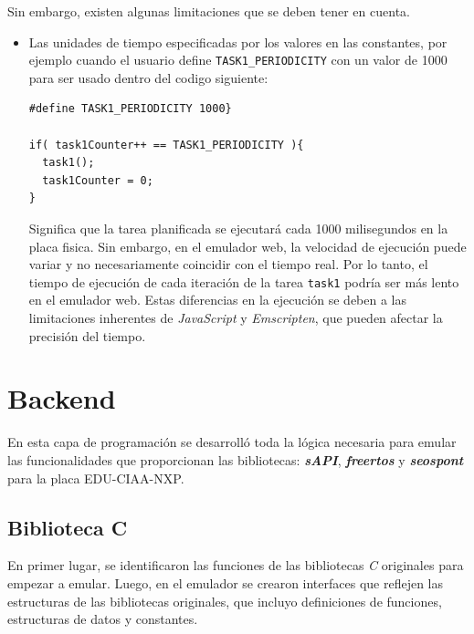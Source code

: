 Sin embargo, existen algunas limitaciones que se deben tener en cuenta.

\begin{itemize}
	\item Las unidades de tiempo especificadas por los valores en las constantes, por ejemplo cuando el usuario define \texttt{TASK1\_PERIODICITY} con un valor de 1000 para ser usado dentro del codigo siguiente: 
	
\begin{lstlisting}[caption={Ejemplo TASK1\_PERIODICITY}]
#define TASK1_PERIODICITY 1000} 

if( task1Counter++ == TASK1_PERIODICITY ){
  task1();
  task1Counter = 0;
}
\end{lstlisting}	
	


Significa que la tarea  planificada se ejecutará cada 1000 milisegundos en la placa fisica. Sin embargo, en el emulador web, la velocidad de ejecución puede variar y no necesariamente coincidir con el tiempo real. Por lo tanto, el tiempo de ejecución de cada iteración de la tarea \texttt{task1} podría ser más lento en el emulador web. Estas diferencias en la ejecución se deben a las limitaciones inherentes de \textit{JavaScript} y \textit{Emscripten}, que pueden afectar la precisión del tiempo.

\end{itemize}

\section{Backend}

En esta capa de programación se desarrolló toda la lógica necesaria para emular las funcionalidades que proporcionan las bibliotecas: \textit{\textbf{sAPI}}, \textit{\textbf{freertos}} y \textit{\textbf{seos\textunderscore pont}} para la placa EDU-CIAA-NXP.

\hfill \break
\hfill \break
\hfill \break


\subsection{Biblioteca C}

En primer lugar, se identificaron las funciones de las bibliotecas \textit{C} originales para empezar a emular. Luego, en el emulador se crearon interfaces que reflejen las estructuras de las bibliotecas originales, que incluyo definiciones de funciones, estructuras de datos y constantes.

